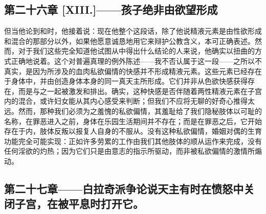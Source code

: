 
\subsection{第二十六章 [XIII.]——孩子绝非由欲望形成}

但当他论到和时，他接着说：现在他整个这段话，除了他说精液元素是由性欲形成和混合的那部分以外，如果他愿意诚恳地用它来辩护公教含义，本可正确表述。然而，对于我们这些完全知道他试图从中得出什么结论的人来说，他确实以扭曲的方式正确地说着。这个对普遍真理的例外陈述——我不否认属于这一段——之所以不真实，是因为所涉及的血肉私欲偏情的快感并不形成精液元素。这些元素已经存在于身体中，并由创造身体本身的同一真天主所形成。它们并非从色欲快感获得存在，而是与之一起被激发和排出。确实，这种快感是否伴随着两性精液元素在子宫内的混合，或许妇女能从其内心感受来判断；但我们不应将无聊的好奇心推得太远。然而，那种我们必须为之羞愧的私欲偏情，其羞耻给了我们隐秘肢体以可耻的名称，在罪恶进入之前，身体在乐园生活期间并不存在；而是在罪恶之后，它开始存在于内，肢体反叛以报复人自身的不服从。没有这种私欲偏情，婚姻对偶的生育功能完全可能实现：正如许多劳累的工作由我们其他肢体的顺从运作来完成，没有任何淫欲的灼热；因为它们只是由意志的指示所驱动，而非被私欲偏情的激情所煽动。\par


\subsection{第二十七章——白拉奇派争论说天主有时在愤怒中关闭子宫，在被平息时打开它。}

